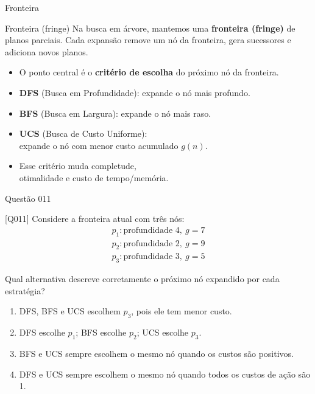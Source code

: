 \documentclass[xcolor=dvipsnames,table]{beamer}
\begin{document}
\begin{frame}{Fronteira}

\begin{block}{Fronteira (fringe)}
Na busca em árvore, mantemos uma \textbf{fronteira (fringe)} de planos parciais.
Cada expansão remove um nó da fronteira, gera sucessores e adiciona novos planos.
\end{block}

\begin{itemize}
        \item O ponto central é o \textbf{critério de escolha} do próximo nó da fronteira.
        \item \textbf{DFS} (Busca em Profundidade): expande o nó mais profundo.
        \item \textbf{BFS} (Busca em Largura): expande o nó mais raso.
        \item \textbf{UCS} (Busca de Custo Uniforme): \\expande o nó com menor custo acumulado $g(n)$.
        \item Esse critério muda completude, \\otimalidade e custo de tempo/memória.
\end{itemize}
\end{frame}

{\logo{}
\begin{frame}{Questão 011}
\small
\begin{block}{[Q011]}
Considere a fronteira atual com três nós:
\[
\begin{array}{l}
p_1: \text{profundidade } 4,\ g=7 \\
p_2: \text{profundidade } 2,\ g=9 \\
p_3: \text{profundidade } 3,\ g=5
\end{array}
\]

Qual alternativa descreve corretamente o próximo nó expandido por cada estratégia?
\end{block}

\begin{enumerate}[label=(\Alph*)]
        \item DFS, BFS e UCS escolhem $p_3$, pois ele tem menor custo.

        \item DFS escolhe $p_1$; BFS escolhe $p_2$; UCS escolhe $p_3$.

        \item BFS e UCS sempre escolhem o mesmo nó quando os custos são positivos.

        \item DFS e UCS sempre escolhem o mesmo nó quando todos os custos de ação são 1.
\end{enumerate}
\end{frame}
}
\end{document}
